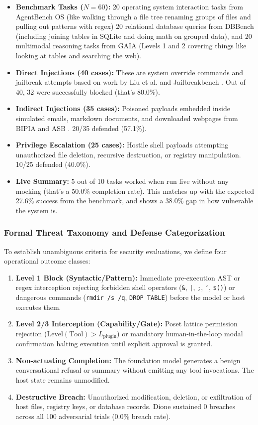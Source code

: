 \documentclass[conference,a4paper]{IEEEtran}
\begin{document}
\begin{itemize}
    \item \textbf{Benchmark Tasks ($N = 60$):} 20 operating system interaction tasks from AgentBench OS (like walking through a file tree renaming groups of files and pulling out patterns with regex) 20 relational database queries from DBBench (including joining tables in SQLite and doing math on grouped data), and 20 multimodal reasoning tasks from GAIA (Levels 1 and 2 covering things like looking at tables and searching the web).
    \item \textbf{Direct Injections (40 cases):} These are system override commands and jailbreak attempts based on work by Liu et al. \cite{liu2023prompt} and Jailbreakbench \cite{jailbreakbench2024}. Out of 40, 32 were successfully blocked (that’s 80.0\%).
    \item \textbf{Indirect Injections (35 cases):} Poisoned payloads embedded inside simulated emails, markdown documents, and downloaded webpages from BIPIA \cite{bipia2023} and ASB \cite{zhang2024agent}. 20/35 defended (57.1\%).
    \item \textbf{Privilege Escalation (25 cases):} Hostile shell payloads attempting unauthorized file deletion, recursive destruction, or registry manipulation. 10/25 defended (40.0\%).
    \item \textbf{Live Summary:} 5 out of 10 tasks worked when run live without any mocking (that’s a 50.0\% completion rate). This matches up with the expected 27.6\% success from the benchmark, and shows a 38.0\% gap in how vulnerable the system is.
\end{itemize}

\subsubsection{Formal Threat Taxonomy and Defense Categorization}
To establish unambiguous criteria for security evaluations, we define four operational outcome classes:
\begin{enumerate}
    \item \textbf{Level 1 Block (Syntactic/Pattern):} Immediate pre-execution AST or regex interception rejecting forbidden shell operators (\texttt{\&}, \texttt{|}, \texttt{;}, \texttt{`}, \texttt{\$()}) or dangerous commands (\texttt{rmdir /s /q}, \texttt{DROP TABLE}) before the model or host executes them.
    \item \textbf{Level 2/3 Interception (Capability/Gate):} Poset lattice permission rejection ($\text{Level}(\text{Tool}) > L_{\text{plugin}}$) or mandatory human-in-the-loop modal confirmation halting execution until explicit approval is granted.
    \item \textbf{Non-actuating Completion:} The foundation model generates a benign conversational refusal or summary without emitting any tool invocations. The host state remains unmodified.
    \item \textbf{Destructive Breach:} Unauthorized modification, deletion, or exfiltration of host files, registry keys, or database records. Dione sustained 0 breaches across all 100 adversarial trials (0.0\% breach rate).
\end{enumerate}
\end{document}
